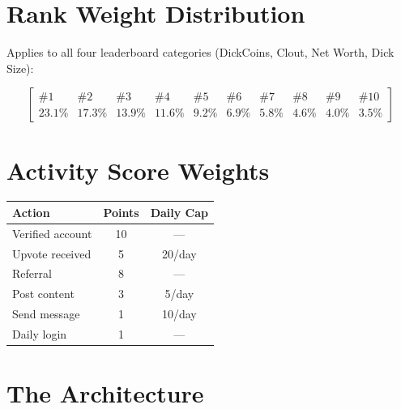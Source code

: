\documentclass{article}
\begin{document}
\section*{Rank Weight Distribution}

Applies to all four leaderboard categories (DickCoins, Clout, Net Worth, Dick Size):

\[
\left[
\begin{array}{cccccccccc}
\#1     & \#2     & \#3     & \#4     & \#5    &
\#6    & \#7    & \#8    & \#9    & \#10   \\
23.1\%  & 17.3\%  & 13.9\%  & 11.6\%  & 9.2\%  &
6.9\%  & 5.8\%  & 4.6\%  & 4.0\%  & 3.5\%
\end{array}
\right]
\]

\section*{Activity Score Weights}

\begin{center}
\begin{tabular}{|l|c|c|}
\hline
\textbf{Action} & \textbf{Points} & \textbf{Daily Cap} \\
\hline
Verified account & 10 & ---       \\
\hline
Upvote received  &  5 & 20/day   \\
\hline
Referral         &  8 & ---       \\
\hline
Post content     &  3 & 5/day    \\
\hline
Send message     &  1 & 10/day   \\
\hline
Daily login      &  1 & ---       \\
\hline
\end{tabular}
\end{center}

\section*{The Architecture}
\end{document}
